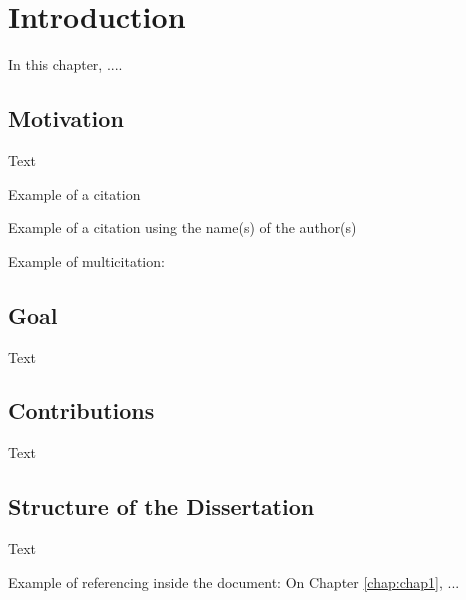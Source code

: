 \chapter{Introduction}
\label{chap:chap0}

In this chapter, ....

\section{Motivation}

Text 

Example of a citation \cite{hall_and_gill}

Example of a citation using the name(s) of the author(s)\citet{hall_and_gill}

Example of multicitation: \cite{goodfellow, murphy}
	
\section{Goal}

Text

\section{Contributions}

Text

\section{Structure of the Dissertation}

Text

Example of referencing inside the document: On Chapter \ref{chap:chap1}, ...
	


	